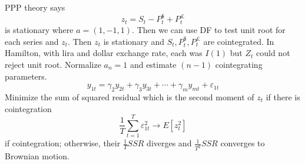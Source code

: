 \documentclass[11pt, a4paper, oneside]{article}
\theoremstyle{definition}
\theoremstyle{proposition}
\theoremstyle{corollary}
\theoremstyle{lemma}
\theoremstyle{theorem}
\begin{document}
\subsection{}
PPP theory says $$z_t = S_t - P_t^{\$} + P_t^{\pounds}$$ is stationary where $a = (1, -1, 1)$. Then we can use DF to test unit root for each series and $z_t$. Then $z_t$ is stationary and $ S_t , P_t^{\$}, P_t^{\pounds}$ are cointegrated. In Hamilton, with lira and dollar exchange rate, each was $I(1)$ but $Z_t$ could not reject unit root. Normalize $a_n = 1$ and estimate $(n -1)$ cointegrating parameters. $$y_{1t} = \gamma_2y_{2t} + \gamma_3y_{3t} + \cdots + \gamma_my_{mt}+ \varepsilon_{1t}$$
Minimize the sum of squared residual which is the second moment of $z_t$ if there is cointegration
$$\frac{1}{T}\sum_{t=1}^T \varepsilon_{1t}^2 \to E[z_t^2]$$ if cointegration; otherwise, their $\frac{1}{T}SSR$ diverges and $\frac{1}{T^2}SSR$ converges to Brownian motion. 
\end{document}
